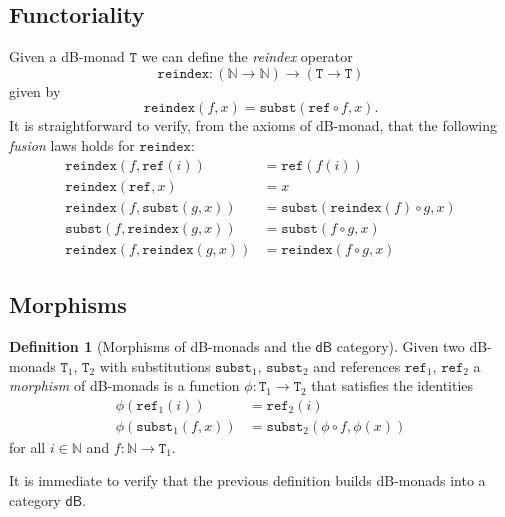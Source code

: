 \documentclass[a4paper,twoside,12pt,draft]{article}
\theoremstyle{definition}
\newtheorem{definition}{Definition}
\theoremstyle{remark}
\newcommand{\dB}{\mathsf{dB}}
\newcommand{\NN}{\mathbb{N}}
\newcommand{\TT}{\mathtt{T}}
\newcommand{\subst}{\mathtt{subst}}
\newcommand{\refe}{\mathtt{ref}}
\newcommand{\reindex}{\mathtt{reindex}}
\begin{document}
\subsection{Functoriality}
\label{sec:functoriality-dbmonad}

Given a dB-monad $\TT$ we can define the \emph{reindex} operator
\begin{equation*}
  \reindex\colon (\NN \to \NN) \to (\TT \to \TT)
\end{equation*}
given by
\begin{equation}
  \label{eq:reindex-as-subst}
  \reindex(f,x) = \subst(\refe \circ f, x).
\end{equation}
It is straightforward to verify, from the axioms of dB-monad, that the
following \emph{fusion} laws holds for $\reindex$:
\begin{align}
  \reindex(f,\refe(i)) &= \refe(f(i)) \\
  \reindex(\refe,x) &= x \\
  \reindex(f,\subst(g,x)) &= \subst(\reindex(f) \circ g, x) \\
  \subst(f,\reindex(g,x)) &= \subst(f \circ g,x) \\
  \reindex(f,\reindex(g,x)) &= \reindex(f\circ g, x)
\end{align}

\subsection{Morphisms}
\label{sec:morphisms-db-monads}

\begin{definition}[Morphisms of dB-monads and the $\dB$ category]
  \label{def:dbmonad-morphism}
  Given two dB-monads $\TT_1$, $\TT_2$ with substitutions $\subst_1$,
  $\subst_2$ and references $\refe_1$, $\refe_2$ a \emph{morphism} of
  dB-monads is a function $\phi\colon \TT_1 \to \TT_2$ that satisfies
  the identities
  \begin{align}
    \phi(\refe_1(i)) &= \refe_2(i)
        \label{eq:dbmonad-morphism-ref} \\
    \phi(\subst_1(f,x)) &= \subst_2(\phi \circ f, \phi(x))
        \label{eq:dbmonad-morphism-subst}
  \end{align}
  for all $i \in \NN$ and $f\colon \NN \to \TT_1$.

  It is immediate to verify that the previous definition builds
  dB-monads into a category $\dB$.
\end{definition}

\end{document}
